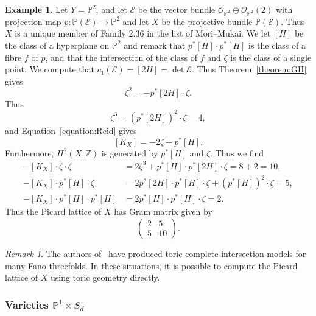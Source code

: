 \documentclass[10pt]{amsart}
\numberwithin{equation}{section}
\theoremstyle{plain}
\theoremstyle{definition}
\newtheorem{example}[theorem]{Example}
\theoremstyle{remark}
\newtheorem{remark}[theorem]{Remark}
\begin{document}
\begin{example}
  Let \(Y=\mathbb{P}^2\), and let \(\mathcal{E}\) be the vector bundle \(\mathcal{O}_{\mathbb{P}^2} \oplus \mathcal{O}_{\mathbb{P}^2}(2)\) with projection map \(p : \mathbb{P}(\mathcal{E}) \rightarrow \mathbb{P}^2\) and let \(X\) be the projective bundle \(\mathbb{P}(\mathcal{E})\). Thus \(X\) is a unique member of Family 2.36 in the list of Mori--Mukai. We let \([H]\) be the class of a hyperplane on \(\mathbb{P}^2\) and remark that \(p^*[H ]\cdot p^*[H] \)  is the class of a fibre \(f\) of \(p\), and that the intersection of the class of \(f\) and \(\zeta\) is the class of a single point. We compute that \(c_1(\mathcal{E}) = [2H] = \det \mathcal{E}\). Thus Theorem~\ref{theorem:GH} gives
  \[
    \zeta^2 = -p^*[2H]\cdot  \zeta.
  \]
  Thus
  \[
    \zeta^3 = (p^* [2H])^2 \cdot \zeta = 4,
  \]
  and Equation~\eqref{equation:Reid} gives
  \[
    [K_X] = -2 \zeta + p^*[H].
  \]
  Furthermore, \(H^2(X,\mathbb{Z})\) is generated by \(p^*[H]\) and \(\zeta\). Thus we find
  \begin{align*}
    -[K_X]\cdot \zeta\cdot\zeta & = 2 \zeta^3 + p^*[H]\cdot p^*[2H] \cdot \zeta = 8 +2 = 10, \\
     -[K_X]\cdot p^* [H]\cdot \zeta  & =  2 p^*[2H] \cdot p^*[H] \cdot \zeta + (p^*[H])^2 \cdot \zeta = 5, \\
    -[K_X]\cdot p^* [H]\cdot p^*[H ] & = 2 p^*[H] \cdot p^*[H] \cdot \zeta = 2.
  \end{align*}
  Thus the Picard lattice of \(X\) has Gram matrix given by
  \[
    \left( \begin{matrix} 2 & 5 \\ 5 & 10 \end{matrix} \right).
  \]
\end{example}

\begin{remark}
  The authors of~\cite{coates2016quantum} have produced toric complete intersection models for many Fano threefolds. In these situations, it is possible to compute the Picard lattice of \(X\) using toric geometry directly.
\end{remark}

\subsubsection{Varieties \(\mathbb{P}^1 \times S_d\)}
\end{document}
